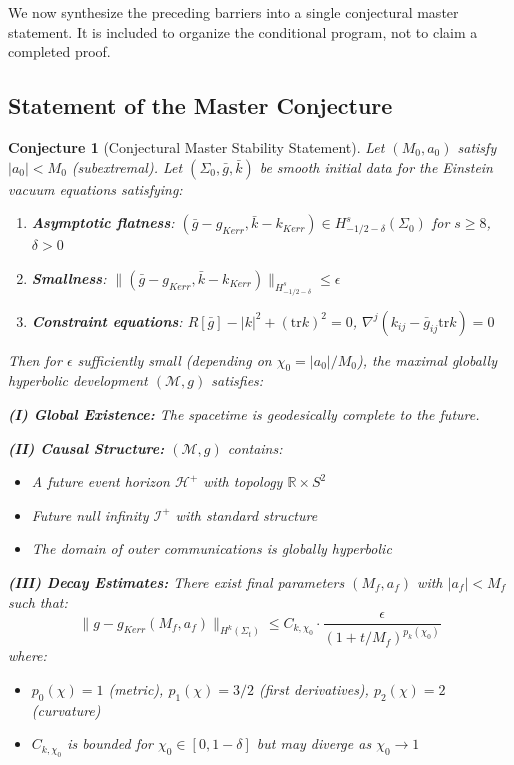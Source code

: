 \documentclass[12pt,a4paper]{article}
\newtheorem{conjecture}[theorem]{Conjecture}
\newcommand{\Scri}{\mathcal{I}^+}
\begin{document}
We now synthesize the preceding barriers into a single conjectural master statement. It is included to organize the conditional program, not to claim a completed proof.

\subsection{Statement of the Master Conjecture}

\begin{conjecture}[Conjectural Master Stability Statement]\label{thm:master-stability}
Let $(M_0, a_0)$ satisfy $|a_0| < M_0$ (subextremal). Let $(\Sigma_0, \bar{g}, \bar{k})$ be smooth initial data for the Einstein vacuum equations satisfying:
\begin{enumerate}
    \item \textbf{Asymptotic flatness}: $(\bar{g} - g_{Kerr}, \bar{k} - k_{Kerr}) \in H^s_{-1/2-\delta}(\Sigma_0)$ for $s \geq 8$, $\delta > 0$
    \item \textbf{Smallness}: $\|(\bar{g} - g_{Kerr}, \bar{k} - k_{Kerr})\|_{H^s_{-1/2-\delta}} \leq \epsilon$
    \item \textbf{Constraint equations}: $R[\bar{g}] - |k|^2 + (\text{tr}k)^2 = 0$, $\nabla^j(k_{ij} - \bar{g}_{ij}\text{tr}k) = 0$
\end{enumerate}

Then for $\epsilon$ sufficiently small (depending on $\chi_0 = |a_0|/M_0$), the maximal globally hyperbolic development $(\mathcal{M}, g)$ satisfies:

\textbf{(I) Global Existence:} The spacetime is geodesically complete to the future.

\textbf{(II) Causal Structure:} $(\mathcal{M}, g)$ contains:
\begin{itemize}
    \item A future event horizon $\mathcal{H}^+$ with topology $\mathbb{R} \times S^2$
    \item Future null infinity $\Scri$ with standard structure
    \item The domain of outer communications is globally hyperbolic
\end{itemize}

\textbf{(III) Decay Estimates:} There exist final parameters $(M_f, a_f)$ with $|a_f| < M_f$ such that:
\begin{equation}\label{eq:master-decay}
\|g - g_{Kerr}(M_f, a_f)\|_{H^k(\Sigma_t)} \leq C_{k,\chi_0} \cdot \frac{\epsilon}{(1 + t/M_f)^{p_k(\chi_0)}}
\end{equation}
where:
\begin{itemize}
    \item $p_0(\chi) = 1$ (metric), $p_1(\chi) = 3/2$ (first derivatives), $p_2(\chi) = 2$ (curvature)
    \item $C_{k,\chi_0}$ is bounded for $\chi_0 \in [0, 1-\delta]$ but may diverge as $\chi_0 \to 1$
\end{itemize}


\end{conjecture}
\end{document}
